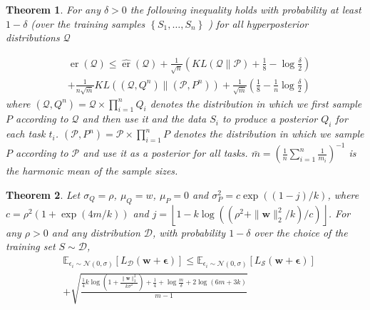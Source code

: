 \documentclass[letterpaper]{article} %
\newtheorem{theorem}{Theorem}
\begin{document}
\begin{theorem} \cite{pentinaPACBayesianBoundLifelong2014}
For any $\delta>0$ the following inequality holds with probability at least $1-\delta$ (over the training samples $\left\{S_1, \ldots, S_n\right\}$ ) for all hyperposterior distributions $\mathcal{Q}$

$$
\begin{aligned}
& \operatorname{er}(\mathcal{Q}) \leq \widehat{\operatorname{er}}(\mathcal{Q})+\frac{1}{\sqrt{n}}\left(K L(\mathcal{Q} \| \mathcal{P})+\frac{1}{8}-\log \frac{\delta}{2}\right) \\
& +\frac{1}{n \sqrt{\bar{m}}} K L\left(\left(\mathcal{Q}, Q^n\right) \|\left(\mathcal{P}, P^n\right)\right)+\frac{1}{\sqrt{\bar{m}}}\left(\frac{1}{8}-\frac{1}{n} \log \frac{\delta}{2}\right)
\end{aligned}
$$
where $\left(\mathcal{Q}, Q^n\right)=\mathcal{Q} \times \prod_{i=1}^n Q_i$ denotes the distribution in which we first sample $P$ according to $\mathcal{Q}$ and then use it and the data $S_i$ to produce a posterior $Q_i$ for each task $t_i$. $\left(\mathcal{P}, P^n\right)=\mathcal{P} \times \prod_{i=1}^n P$ denotes the distribution in which we sample $P$ according to $\mathcal{P}$ and use it as a posterior for all tasks. $\bar{m}=\left(\frac{1}{n} \sum_{i=1}^n \frac{1}{m_i}\right)^{-1}$ is the harmonic mean of the sample sizes.
\end{theorem}


\begin{theorem} \cite{foretSharpnessAwareMinimizationEfficiently2021}
Let $\sigma_Q=\rho$, $\mu_Q=w$, $\mu_P = 0$ and $\sigma^2_P = c \exp((1 - j)/k)$, where $c = \rho^2(1 + \exp(4m/k))$ and $j=\left\lfloor 1-k \log \left(\left(\rho^2+\|\boldsymbol{w}\|_2^2 / k\right) / c\right)\right\rfloor$. For any $\rho > 0$ and any distribution $\mathcal{D}$, with probability $1 - \delta$ over the choice of the training set $S \sim \mathcal{D}$,
\begin{equation}
\begin{aligned}
&\mathbb{E}_{\epsilon_i \sim \mathcal{N}(0, \sigma)}\left[L_{\mathcal{D}}(\boldsymbol{w}+\boldsymbol{\epsilon})\right] 
\leq 
\mathbb{E}_{\epsilon_i \sim \mathcal{N}(0, \sigma)}\left[L_{\mathcal{S}}(\boldsymbol{w}+\boldsymbol{\epsilon})\right] \\
&+\sqrt{\frac{\frac{1}{4} k \log \left(1+\frac{\|\boldsymbol{w}\|_2^2}{k \sigma^2}\right)+\frac{1}{4}+\log \frac{m}{\delta}+2 \log (6 m+3 k)}{m-1}}
\end{aligned}
\end{equation}
    
\end{theorem}
\end{document}
